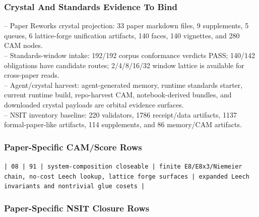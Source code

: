 \documentclass[11pt]{article}
\begin{document}
\subsubsection*{Crystal And Standards Evidence To Bind}

\noindent{}-- Paper Reworks crystal projection: 33 paper markdown files, 9 supplements, 5 queues, 6 lattice-forge unification artifacts, 140 faces, 140 vignettes, and 280 CAM nodes.\\
\noindent{}-- Standards-window intake: 192/192 corpus conformance verdicts PASS; 140/142 obligations have candidate routes; 2/4/8/16/32 window lattice is available for cross-paper reads.\\
\noindent{}-- Agent/crystal harvest: agent-generated memory, runtime standards starter, current runtime build, repo-harvest CAM, notebook-derived bundles, and downloaded crystal payloads are orbital evidence surfaces.\\
\noindent{}-- NSIT inventory baseline: 220 validators, 1786 receipt/data artifacts, 1137 formal-paper-like artifacts, 114 supplements, and 86 memory/CAM artifacts.\\

\subsubsection*{Paper-Specific CAM/Score Rows}

\noindent\texttt{| 08 | 91 | system-composition closeable | finite E8/E8x3/Niemeier chain, no-cost Leech lookup, lattice forge surfaces | expanded Leech invariants and nontrivial glue cosets |}\\

\subsubsection*{Paper-Specific NSIT Closure Rows}
\end{document}
